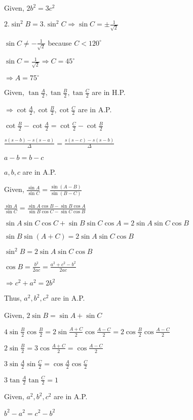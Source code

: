   Given, $2b^2 = 3c^2$

  $2.\sin^2B = 3.\sin^2C \Rightarrow \sin C = \pm\frac{1}{\sqrt{2}}$

  $\sin C\neq -\frac{1}{\sqrt{2}}$ because $C < 120^\circ$

  $\sin C = \frac{1}{\sqrt{2}} \Rightarrow C = 45^\circ$

  $\Rightarrow A = 75^\circ$

\item Given, $\tan\frac{A}{2}, \tan\frac{B}{2}, \tan\frac{C}{2}$ are in H.P.

  $\Rightarrow \cot \frac{A}{2}, \cot\frac{B}{2}, \cot\frac{C}{2}$ are in A.P.

  $\cot\frac{B}{2} - \cot\frac{A}{2} = \cot\frac{C}{2}- \cot\frac{B}{2}$

  $\frac{s(s - b) - s(s - a)}{\Delta} = \frac{s(s - c) - s(s - b)}{\Delta}$

  $a - b = b - c$

  $a, b, c$ are in A.P.

\item Given, $\frac{\sin A}{\sin C} = \frac{\sin(A - B)}{\sin(B - C)}$

  $\frac{\sin A}{\sin C} = \frac{\sin A\cos B - \sin B \cos A}{\sin B\cos C - \sin C\cos B}$

  $\sin A\sin C\cos C + \sin B\sin C\cos A = 2\sin A\sin C\cos B$

  $\sin B\sin(A + C) = 2\sin A\sin C\cos B$

  $\sin^2B = 2\sin A\sin C\cos B$

  $\cos B = \frac{b^2}{2ac} = \frac{a^2 + c^2 - b^2}{2ac}$

  $\Rightarrow c^2 + a^2 = 2b^2$

  Thus, $a^2, b^2, c^2$ are in A.P.

\item Given, $2\sin B = \sin A + \sin C$

  $4\sin\frac{B}{2}\cos\frac{B}{2} = 2\sin\frac{A + C}{2}\cos\frac{A - C}{2} = 2\cos\frac{B}{2}\cos\frac{A - C}{2}$

  $2\sin\frac{B}{2} = 3\cos\frac{A + C}{2} = \cos\frac{A - C}{2}$

  $3\sin\frac{A}{2}\sin\frac{C}{2} = \cos\frac{A}{2}\cos\frac{C}{2}$

  $3\tan\frac{A}{2}\tan\frac{C}{2} = 1$

\item Given, $a^2, b^2, c^2$ are in A.P.

  $b^2 - a^2 = c^2 - b^2$

